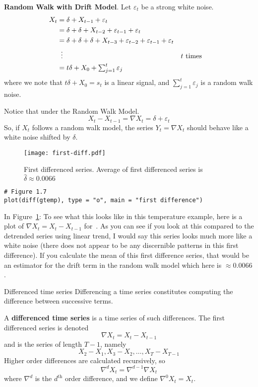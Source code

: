 \textbf{Random Walk with Drift Model}. Let $ \varepsilon_t $ be a strong white noise.
\begin{align*}
    X_t
     & =\delta+X_{t-1}+\varepsilon_t                                                                             \\
     & =\delta+\delta+X_{t-2}+\varepsilon_{t-1}+\varepsilon_t                                                    \\
     & =\delta+\delta+\delta+X_{t-3}+\varepsilon_{t-2}+\varepsilon_{t-1}+\varepsilon_{t}                         \\
     & \vdotswithin{=}                                                                   &  & \text{$ t $ times} \\
     & =t\delta+X_0+\textstyle \sum_{j=1}^{t} \varepsilon_j
\end{align*}
where we note that $ t\delta+X_0=s_t $ is a linear signal,
and $ \sum_{j=1}^{t} \varepsilon_j $ is a
random walk noise.

Notice that under the Random Walk Model.
\[ X_t-X_{t-1}=\nabla X_t=\delta+\varepsilon_t \]
So, if $ X_t $ follows a random walk model, the series $ Y_t=\nabla X_t $
should behave like a white noise shifted by $ \delta $.
\begin{figure}[!htbp]
    \centering
    \texttt{[image: first-diff.pdf]}
    \caption{First differenced series. Average of first differenced series
        is $ \hat{\delta}\approx 0.0066 $}\label{fig:firstdiff}
\end{figure}
\begin{verbatim}
# Figure 1.7
plot(diff(gtemp), type = "o", main = "first difference")
\end{verbatim}
In Figure~\ref{fig:firstdiff}:
{\color{blue}To see what this looks like in this temperature example, here is a plot
of $ \nabla X_t=X_t-X_{t-1} $ for~. As you can
see if you look at this compared to the detrended series using linear trend,
I would say this series looks much more like a white noise (there does not
appear to be any discernible patterns in this first difference). If you calculate the mean
of this first difference series, that would be an estimator for the drift term
in the random walk model which here is $ \approx 0.0066 $.}

\begin{Definition}{Differenced time series}{}
    Differencing a time series constitutes
    computing the difference between successive terms.

    A \textbf{differenced time series} is a time series of such differences.
    The first differenced series is denoted
    \[ \nabla X_t=X_t-X_{t-1} \]
    and is the series of length $ T-1 $, namely
    \[ X_2-X_1,X_3-X_2,\ldots,X_T-X_{T-1} \]
    Higher order differences are calculated recursively, so
    \[ \nabla^d X_t=\nabla^{d-1}\nabla X_t \]
    where $ \nabla^d $ is the $ d^{\text{th}} $ order difference, and
    we define $ \nabla^0 X_t=X_t $.
\end{Definition}

